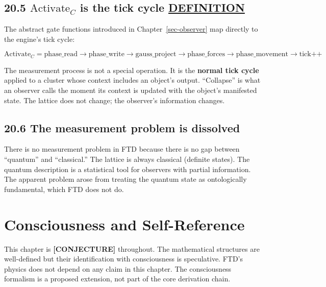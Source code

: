 \documentclass[
  11pt,
  letterpaper,
  twoside,
  openright]{book}
\begin{document}
\section{\texorpdfstring{20.5 \(\text{Activate}_C\) is the tick cycle
\hyperref[definition]{DEFINITION}}{20.5 \textbackslash text\{Activate\}\_C is the tick cycle DEFINITION}}\label{textactivate_c-is-the-tick-cycle-definition}

The abstract gate functions introduced in Chapter~\ref{sec-observer} map
directly to the engine's tick cycle:

\[
\text{Activate}_C = \text{phase\_read} \to \text{phase\_write} \to \text{gauss\_project} \to \text{phase\_forces} \to \text{phase\_movement} \to \text{tick++}
\]

The measurement process is not a special operation. It is the
\textbf{normal tick cycle} applied to a cluster whose context includes
an object's output. ``Collapse'' is what an observer calls the moment
its context is updated with the object's manifested state. The lattice
does not change; the observer's information changes.

\section{20.6 The measurement problem is
dissolved}\label{the-measurement-problem-is-dissolved}

There is no measurement problem in FTD because there is no gap between
``quantum'' and ``classical.'' The lattice is always classical (definite
states). The quantum description is a statistical tool for observers
with partial information. The apparent problem arose from treating the
quantum state as ontologically fundamental, which FTD does not do.

\chapter{Consciousness and Self-Reference}\label{sec-consciousness}

\begin{tcolorbox}[enhanced jigsaw, coltitle=black, colbacktitle=quarto-callout-warning-color!10!white, toprule=.15mm, colframe=quarto-callout-warning-color-frame, arc=.35mm, opacityback=0, bottomtitle=1mm, toptitle=1mm, breakable, colback=white, titlerule=0mm, opacitybacktitle=0.6, title=\textcolor{quarto-callout-warning-color}{\faExclamationTriangle}\hspace{0.5em}{Epistemic notice}, rightrule=.15mm, bottomrule=.15mm, leftrule=.75mm, left=2mm]

This chapter is \textbf{{[}CONJECTURE{]}} throughout. The mathematical
structures are well-defined but their identification with consciousness
is speculative. FTD's physics does not depend on any claim in this
chapter. The consciousness formalism is a proposed extension, not part
of the core derivation chain.

\end{tcolorbox}
\end{document}
